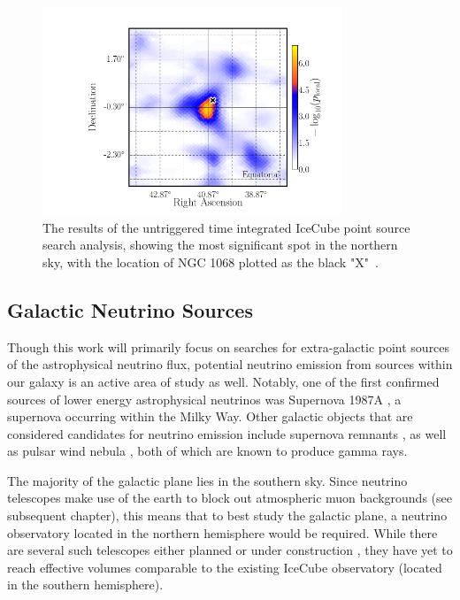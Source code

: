 \begin{figure}[h]
\centering
\includegraphics[width=0.8\textwidth]{figs/NGC_tint.png}
\caption{The results of the untriggered time integrated IceCube point source search analysis, showing the most significant spot in the northern sky, with the location of NGC 1068 plotted as the black "X"~\cite{10yr_tint}. }
\label{fig:NGC_tint}
\end{figure}


\subsection{Galactic Neutrino Sources}
Though this work will primarily focus on searches for extra-galactic point sources of the astrophysical neutrino flux, potential neutrino emission from sources within our galaxy is an active area of study as well. Notably, one of the first confirmed sources of lower energy astrophysical neutrinos was Supernova 1987A \cite{Bionta:1987qt}, a supernova occurring within the Milky Way. Other galactic objects that are considered candidates for neutrino emission include supernova remnants \cite{snr_2020}, as well as pulsar wind nebula \cite{pwn_2020}, both of which are known to produce gamma rays. 

The majority of the galactic plane lies in the southern sky. Since neutrino telescopes make use of the earth to block out atmospheric muon backgrounds (see subsequent chapter), this means that to best study the galactic plane, a neutrino observatory located in the northern hemisphere would be required. While there are several such telescopes either planned or under construction \cite{Agostini_2020}\cite{kappes2007km3net}, they have yet to reach effective volumes comparable to the existing IceCube observatory (located in the southern hemisphere). 

